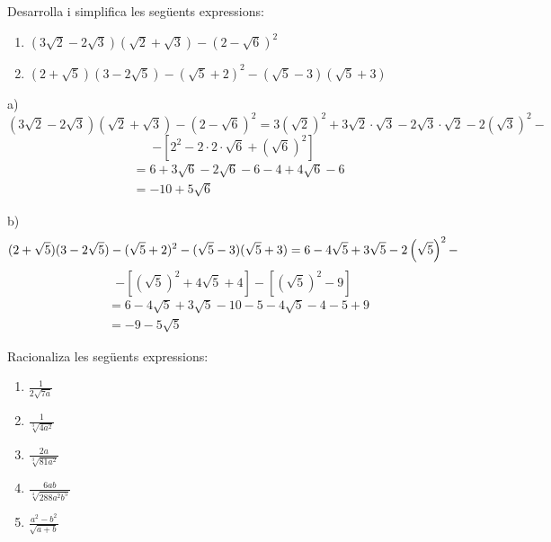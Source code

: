 \begin{exercici}
Desarrolla i simplifica les següents expressions:

\begin{enumerate}
\item[a)] $(3\sqrt{2}-2\sqrt{3})(\sqrt{2}+\sqrt{3})-(2-\sqrt{6})^{2}$

\item[b)] $(2+\sqrt{5})(3-2\sqrt{5})-(\sqrt{5}+2)^{2}-(\sqrt{5}-3)(\sqrt{5}%
+3)$
\end{enumerate}

\end{exercici}

\begin{solucio}
a)%
\begin{equation*}
(3\sqrt{2}-2\sqrt{3})(\sqrt{2}+\sqrt{3})-(2-\sqrt{6})^{2}=3\left( \sqrt{2}%
\right) ^{2}+3\sqrt{2}\cdot \sqrt{3}-2\sqrt{3}\cdot \sqrt{2}-2\left( \sqrt{3}%
\right) ^{2}-
\end{equation*}%
\begin{equation*}
-\left[ 2^{2}-2\cdot 2\cdot \sqrt{6}+\left( \sqrt{6}\right) ^{2}\right]
\end{equation*}%
\begin{align*}
&=6+3\sqrt{6}-2\sqrt{6}-6-4+4\sqrt{6}-6 \\
&=-10+5\sqrt{6}
\end{align*}

b)%
\begin{equation*}
(2+\sqrt{5})(3-2\sqrt{5})-(\sqrt{5}+2)^{2}-(\sqrt{5}-3)(\sqrt{5}+3)=6-4\sqrt{%
5}+3\sqrt{5}-2\left( \sqrt{5}\right) ^{2}-
\end{equation*}%
\begin{equation*}
-\left[ \left( \sqrt{5}\right) ^{2}+4\sqrt{5}+4\right] -\left[ \left( \sqrt{5%
}\right) ^{2}-9\right]
\end{equation*}%
\begin{align*}
&=6-4\sqrt{5}+3\sqrt{5}-10-5-4\sqrt{5}-4-5+9 \\
&=-9-5\sqrt{5}
\end{align*}
\end{solucio}

\begin{exercici}
Racionaliza les següents expressions:

\begin{enumerate}
\item[a)] $\frac{1}{2\sqrt{7a}}$

\item[b)] $\frac{1}{\sqrt[3]{4a^{2}}}$

\item[c)] $\frac{2a}{\sqrt[3]{81a^{2}}}$

\item[d)] $\frac{6ab}{\sqrt[4]{288a^{2}b^{5}}}$

\item[e)] $\frac{a^{2}-b^{2}}{\sqrt{a+b}}$
\end{enumerate}

\end{exercici}

